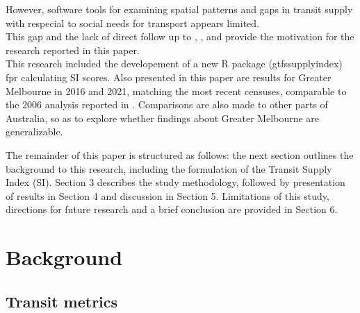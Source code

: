 \documentclass[preprint, 3p,
authoryear]{elsarticle} %
\begin{document}
However, software tools for examining spatial patterns and gaps in
transit supply with respecial to social needs for transport appears
limited.\\
This gap and the lack of direct follow up to \citet{Currie2003Hobart},
\citet{Currie2004Gap}, \citet{Currie2007Identifying} and
\citet{currie2010identifying} provide the motivation for the research
reported in this paper.\\
This research included the developement of a new R package
(gtfssupplyindex) fpr calculating SI scores. Also presented in this
paper are results for Greater Melbourne in 2016 and 2021, matching the
most recent censuses, comparable to the 2006 analysis reported in
\citet{currie2010identifying}. Comparisons are also made to other parts
of Australia, so as to explore whether findings about Greater Melbourne
are generalizable.

The remainder of this paper is structured as follows: the next section
outlines the background to this research, including the formulation of
the Transit Supply Index (SI). Section 3 describes the study
methodology, followed by presentation of results in Section 4 and
discussion in Section 5. Limitations of this study, directions for
future research and a brief conclusion are provided in Section 6.

\section{Background}\label{background}

\subsection{Transit metrics}\label{transit-metrics}
\end{document}
